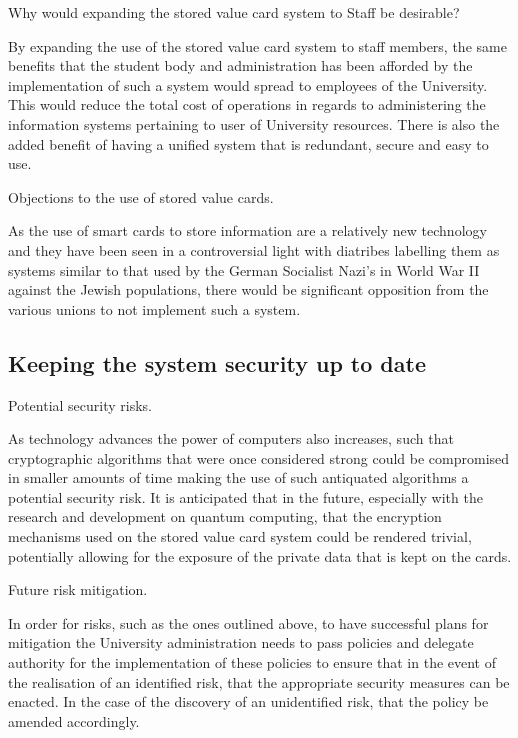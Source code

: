\items Why would expanding the stored value card system to Staff be desirable?

By expanding the use of the stored value card system to staff members, the same
benefits that the student body and administration has been afforded by the
implementation of such a system would spread to employees of the University.
This would reduce the total cost of operations in regards to administering the
information systems pertaining to user of University resources. There is also
the added benefit of having a unified system that is redundant, secure and easy
to use.

\items Objections to the use of stored value cards.

As the use of smart cards to store information are a relatively new technology
and they have been seen in a controversial light with diatribes labelling them
as systems similar to that used by the German Socialist Nazi's in World War II
against the Jewish populations, there would be significant opposition from the
various unions to not implement such a system.

\subsection{Keeping the system security up to date}

\items Potential security risks.

As technology advances the power of computers also increases, such that
cryptographic algorithms that were once considered strong could be compromised
in smaller amounts of time making the use of such antiquated algorithms a
potential security risk. It is anticipated that in the future, especially with
the research and development on quantum computing, that the encryption
mechanisms used on the stored value card system could be rendered trivial,
potentially allowing for the exposure of the private data that is kept on the
cards.

\items Future risk mitigation.

In order for risks, such as the ones outlined above, to have successful plans
for mitigation the University administration needs to pass policies and
delegate authority for the implementation of these policies to ensure that in
the event of the realisation of an identified risk, that the appropriate
security measures can be enacted. In the case of the discovery of an
unidentified risk, that the policy be amended accordingly.
